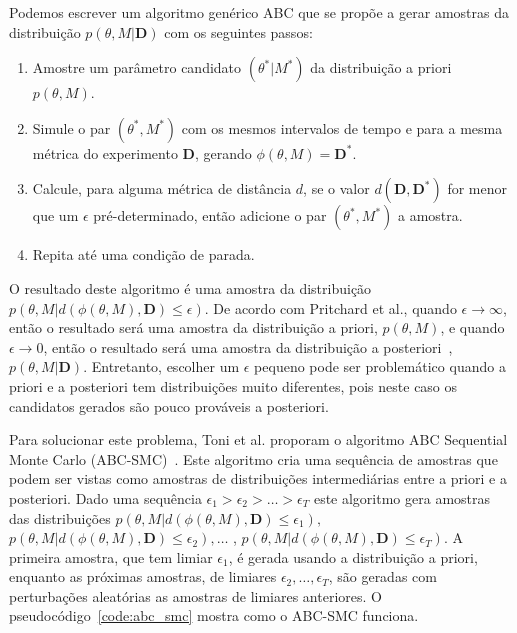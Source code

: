 \documentclass[12pt]{article}
\begin{document}
Podemos escrever um algoritmo genérico ABC que se propõe a gerar 
amostras da distribuição $p(\theta, M | \mathbf{D})$ com os seguintes 
passos:
\begin{enumerate}
    \item Amostre um parâmetro candidato $(\theta^* | M^*)$ da
        distribuição a priori $p(\theta, M)$.
    \item Simule o par $(\theta^*, M^*)$ com os mesmos intervalos de
        tempo e para a mesma métrica do experimento $\mathbf{D}$, 
        gerando $\phi(\theta, M) = \mathbf{D}^*$.
    \item Calcule, para alguma métrica de distância $d$, se o valor $d 
        (\mathbf{D}, \mathbf{D^*})$ for menor que um $\epsilon$
        pré-determinado, então adicione o par $(\theta^*, M^*)$ a 
        amostra.
    \item Repita até uma condição de parada.
\end{enumerate}
O resultado deste algoritmo é uma amostra da distribuição $p (\theta, M
| d(\phi(\theta, M), \mathbf{D}) \leq \epsilon).$ De acordo com
Pritchard et al., quando $\epsilon \to \infty$, então o resultado será
uma amostra da distribuição a priori, $p (\theta, M)$, e quando 
$\epsilon \to 0$, então o resultado será uma amostra da distribuição a
posteriori~\cite{Pritchard1999}, $p (\theta, M | \mathbf{D})$.
Entretanto, escolher um $\epsilon$ pequeno pode ser problemático quando
a priori e a posteriori tem distribuições muito diferentes, pois neste
caso os candidatos gerados são pouco prováveis a posteriori.

Para solucionar este problema, Toni et al. proporam o algoritmo ABC
Sequential Monte Carlo (ABC-SMC)~\cite{Toni2008}. Este algoritmo cria
uma sequência de amostras que podem ser vistas como amostras de
distribuições intermediárias entre a priori e a posteriori. Dado uma
sequência $\epsilon_1 > \epsilon_2 > \ldots > \epsilon_T$ este algoritmo
gera amostras das distribuições 
$p (\theta, M | d(\phi(\theta, M), \mathbf{D}) \leq \epsilon_1),$
$p (\theta, M | d(\phi(\theta, M), \mathbf{D}) \leq \epsilon_2), \ldots$
, $p (\theta, M | d(\phi(\theta, M), \mathbf{D}) \leq \epsilon_T).$ A
primeira amostra, que tem limiar $\epsilon_1$, é gerada usando a 
distribuição a priori, enquanto as próximas amostras, de limiares
$\epsilon_2, \ldots, \epsilon_T$, são geradas com perturbações 
aleatórias as amostras de limiares anteriores. O 
pseudocódigo~\ref{code:abc_smc} mostra como o ABC-SMC funciona.
\end{document}
